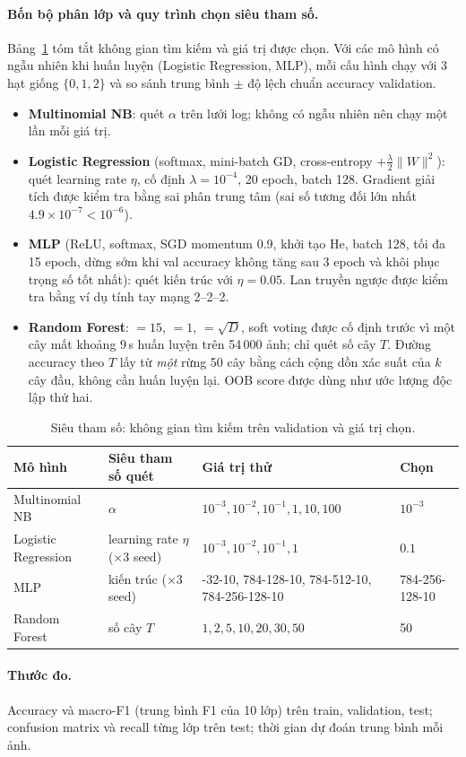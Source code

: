 \paragraph{Bốn bộ phân lớp và quy trình chọn siêu tham số.} Bảng~\ref{tab:hparams} tóm tắt không gian tìm kiếm và giá trị được chọn. Với các mô hình có ngẫu nhiên khi huấn luyện (Logistic Regression, MLP), mỗi cấu hình chạy với 3 hạt giống $\{0,1,2\}$ và so sánh trung bình $\pm$ độ lệch chuẩn accuracy validation.
\begin{itemize}
\item \textbf{Multinomial NB}: quét $\alpha$ trên lưới log; không có ngẫu nhiên nên chạy một lần mỗi giá trị.
\item \textbf{Logistic Regression} (softmax, mini-batch GD, cross-entropy $+\frac\lambda2\|W\|^2$): quét learning rate $\eta$, cố định $\lambda=10^{-4}$, 20 epoch, batch 128. Gradient giải tích được kiểm tra bằng sai phân trung tâm (sai số tương đối lớn nhất $4.9\times10^{-7}<10^{-6}$).
\item \textbf{MLP} (ReLU, softmax, SGD momentum 0.9, khởi tạo He, batch 128, tối đa 15 epoch, dừng sớm khi val accuracy không tăng sau 3 epoch và khôi phục trọng số tốt nhất): quét kiến trúc với $\eta=0.05$. Lan truyền ngược được kiểm tra bằng ví dụ tính tay mạng 2--2--2.
\item \textbf{Random Forest}: $=15$, $=1$, $=\sqrt{D}$, soft voting được cố định trước vì một cây mất khoảng 9\,s huấn luyện trên 54\,000 ảnh; chỉ quét số cây $T$. Đường accuracy theo $T$ lấy từ \emph{một} rừng 50 cây bằng cách cộng dồn xác suất của $k$ cây đầu, không cần huấn luyện lại. OOB score được dùng như ước lượng độc lập thứ hai.
\end{itemize}
 
\begin{table}[H]
\centering\small
\caption{Siêu tham số: không gian tìm kiếm trên validation và giá trị chọn.}\label{tab:hparams}
\begin{tabular}{@{}l l >{\raggedright\arraybackslash}p{5.6cm} l@{}}
\toprule
Mô hình & Siêu tham số quét & Giá trị thử & Chọn \\
\midrule
Multinomial NB & $\alpha$ & $10^{-3},10^{-2},10^{-1},1,10,100$ & $10^{-3}$ \\
Logistic Regression & learning rate $\eta$ ($\times$3 seed) & $10^{-3},10^{-2},10^{-1},1$ & $0.1$ \\
MLP & kiến trúc ($\times$3 seed) & 784-32-10, 784-128-10, 784-512-10, 784-256-128-10 & 784-256-128-10 \\
Random Forest & số cây $T$ & $1,2,5,10,20,30,50$ & 50 \\
\bottomrule
\end{tabular}
\end{table}
 
\paragraph{Thước đo.} Accuracy và macro-F1 (trung bình F1 của 10 lớp) trên train, validation, test; confusion matrix và recall từng lớp trên test; thời gian dự đoán trung bình mỗi ảnh.